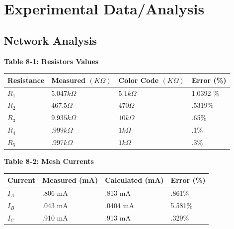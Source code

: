\documentclass[a4paper]{article}
\begin{document}
\section{Experimental Data/Analysis}

\subsection{Network Analysis}

\begin{center}
    \small\textbf{Table 8-1: Resistors Values}
    \begin{tabular}{|p{3 cm}|p{3cm}|p{3 cm}|p{3 cm}|}
        \hline
        Resistance & Measured $(K\Omega)$ & Color Code $(K\Omega)$ & Error (\%) \\
        \hline
        $R_{1}$ & $5.047 k\Omega$ & $5.1k\Omega$ & 1.0392 \% \\
        \hline
        $R_{2}$ & $467.5 \Omega$ & $470\Omega$& .5319\% \\
        \hline
        $R_{3}$ & $9.935 k\Omega$ & $10 k\Omega$& .65\% \\
        \hline
        $R_{4}$ & $.999 k\Omega$ & $1 k\Omega$& .1\% \\
        \hline
        $R_{5}$ & $.997 k\Omega$ & $1 k\Omega$ & .3\% \\
        \hline
    \end{tabular}
\end{center}

\begin{center}
    \small\textbf{Table 8-2: Mesh Currents}
    \begin{tabular}{|p{3 cm}|p{3cm}|p{3 cm}|p{3 cm}|}
        \hline
        Current & Measured (mA) & Calculated (mA) & Error (\%) \\
        \hline
        $I_{A}$ & .806 mA & .813 mA & .861\%  \\
        \hline
        $I_{B}$ & .043 mA & .0404 mA & 5.581\% \\
        \hline
        $I_{C}$ & .910 mA & .913 mA & .329\% \\
        \hline
    \end{tabular}
\end{center}
\end{document}
